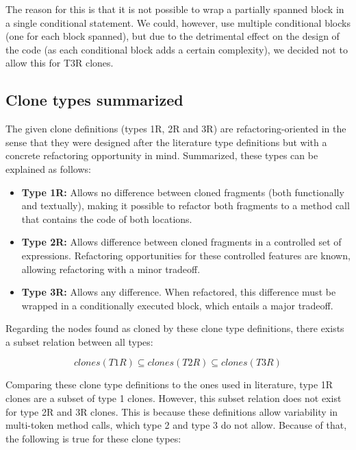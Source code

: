 The reason for this is that it is not possible to wrap a partially spanned block in a single conditional statement. We could, however, use multiple conditional blocks (one for each block spanned), but due to the detrimental effect on the design of the code (as each conditional block adds a certain complexity), we decided not to allow this for T3R clones.

\subsection{Clone types summarized}
The given clone definitions (types 1R, 2R and 3R) are refactoring-oriented in the sense that they were designed after the literature type definitions but with a concrete refactoring opportunity in mind. Summarized, these types can be explained as follows:

\begin{itemize}
\item \textbf{Type 1R:} Allows no difference between cloned fragments (both functionally and textually), making it possible to refactor both fragments to a method call that contains the code of both locations. \\
\item \textbf{Type 2R:} Allows difference between cloned fragments in a controlled set of expressions. Refactoring opportunities for these controlled features are known, allowing refactoring with a minor tradeoff. \\
\item \textbf{Type 3R:} Allows any difference. When refactored, this difference must be wrapped in a conditionally executed block, which entails a major tradeoff.
\end{itemize}

Regarding the nodes found as cloned by these clone type definitions, there exists a subset relation between all types:

\begin{equation}\label{eq:typerelation}
clones(T1R) \subseteq clones(T2R) \subseteq clones(T3R)
\end{equation}

Comparing these clone type definitions to the ones used in literature, type 1R clones are a subset of type 1 clones. However, this subset relation does not exist for type 2R and 3R clones. This is because these definitions allow variability in multi-token method calls, which type 2 and type 3 do not allow. Because of that, the following is true for these clone types:

